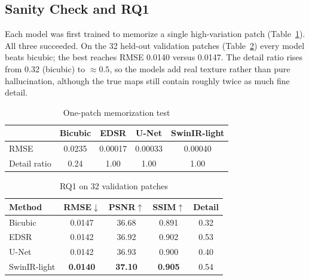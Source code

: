 \documentclass[conference]{IEEEtran}
\begin{document}
\subsection{Sanity Check and RQ1}
Each model was first trained to memorize a single high-variation patch (Table~\ref{tab:onepatch}). All three succeeded. On the 32 held-out validation patches (Table~\ref{tab:rq1}) every model beats bicubic; the best reaches RMSE 0.0140 versus 0.0147. The detail ratio rises from 0.32 (bicubic) to \(\approx0.5\), so the models add real texture rather than pure hallucination, although the true maps still contain roughly twice as much fine detail.
\begin{table}[htbp]
\caption{One-patch memorization test}
\label{tab:onepatch}
\centering\footnotesize
\begin{tabular}{lcccc}
\toprule
 & Bicubic & EDSR & U-Net & SwinIR-light \\
\midrule
RMSE & 0.0235 & 0.00017 & 0.00033 & 0.00040 \\
Detail ratio & 0.24 & 1.00 & 1.00 & 1.00 \\
\bottomrule
\end{tabular}
\end{table}
\begin{table}[htbp]
\caption{RQ1 on 32 validation patches}
\label{tab:rq1}
\centering\footnotesize
\begin{tabular}{lcccc}
\toprule
Method & RMSE$\downarrow$ & PSNR$\uparrow$ & SSIM$\uparrow$ & Detail \\
\midrule
Bicubic & 0.0147 & 36.68 & 0.891 & 0.32 \\
EDSR & 0.0142 & 36.92 & 0.902 & 0.53 \\
U-Net & 0.0142 & 36.93 & 0.900 & 0.40 \\
SwinIR-light & \textbf{0.0140} & \textbf{37.10} & \textbf{0.905} & 0.54 \\
\bottomrule
\end{tabular}
\end{table}
\end{document}

